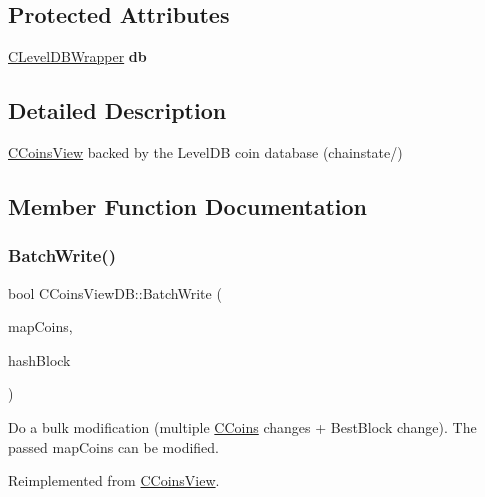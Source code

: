 \subsection*{Protected Attributes}
\begin{DoxyCompactItemize}
\item 
\mbox{\label{class_c_coins_view_d_b_aba0a7b26fe82c1a2e80ca060d12fb66a}} 
\mbox{\hyperlink{class_c_level_d_b_wrapper}{C\+Level\+D\+B\+Wrapper}} {\bfseries db}
\end{DoxyCompactItemize}


\subsection{Detailed Description}
\mbox{\hyperlink{class_c_coins_view}{C\+Coins\+View}} backed by the Level\+DB coin database (chainstate/) 

\subsection{Member Function Documentation}
\mbox{\label{class_c_coins_view_d_b_a33f98ec9323ce48e1704327bc8a2a002}} 
\subsubsection{\texorpdfstring{Batch\+Write()}{BatchWrite()}}
{\footnotesize\ttfamily bool C\+Coins\+View\+D\+B\+::\+Batch\+Write (\begin{DoxyParamCaption}\item[{C\+Coins\+Map \&}]{map\+Coins,  }\item[{const \mbox{\hyperlink{classuint256}{uint256}} \&}]{hash\+Block }\end{DoxyParamCaption})\hspace{0.3cm}{\ttfamily [virtual]}}

Do a bulk modification (multiple \mbox{\hyperlink{class_c_coins}{C\+Coins}} changes + Best\+Block change). The passed map\+Coins can be modified. 

Reimplemented from \mbox{\hyperlink{class_c_coins_view_ad7dc37396ca4fac7014cea06fec7178e}{C\+Coins\+View}}.

\mbox{\label{class_c_coins_view_d_b_af55f35faadeb74b5406559fe3ed20114}} 
